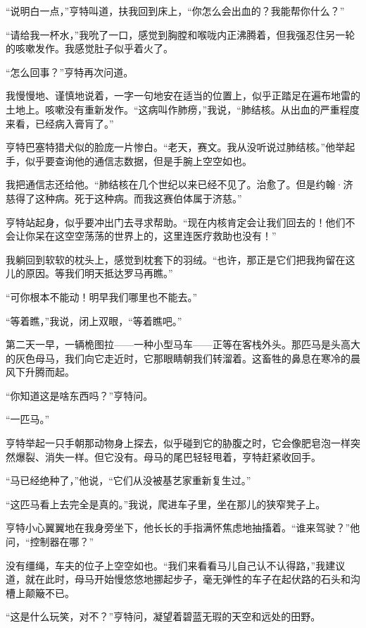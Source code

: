 \documentclass[AutoFakeBold=true]{book}
\begin{document}
``说明白一点，''亨特叫道，扶我回到床上，``你怎么会出血的？我能帮你什么？''

``请给我一杯水，''我吮了一口，感觉到胸膛和喉咙内正沸腾着，但我强忍住另一轮的咳嗽发作。我感觉肚子似乎着火了。

``怎么回事？''亨特再次问道。

我慢慢地、谨慎地说着，一字一句地安在适当的位置上，似乎正踏足在遍布地雷的土地上。咳嗽没有重新发作。``这病叫作肺痨，''我说，``肺结核。从出血的严重程度来看，已经病入膏肓了。''

亨特巴塞特猎犬似的脸庞一片惨白。``老天，赛文。我从没听说过肺结核。''他举起手，似乎要查询他的通信志数据，但是手腕上空空如也。

我把通信志还给他。``肺结核在几个世纪以来已经不见了。治愈了。但是约翰·济慈得了这种病。死于这种病。而我这赛伯体属于济慈。''

亨特站起身，似乎要冲出门去寻求帮助。``现在内核肯定会让我们回去的！他们不会让你呆在这空空荡荡的世界上的，这里连医疗救助也没有！''

我躺回到软软的枕头上，感觉到枕套下的羽绒。``也许，那正是它们把我拘留在这儿的原因。等我们明天抵达罗马再瞧。''

``可你根本不能动！明早我们哪里也不能去。''

``等着瞧，''我说，闭上双眼，``等着瞧吧。''

\vspace*{1em}

第二天一早，一辆桅图拉——一种小型马车——正等在客栈外头。那匹马是头高大的灰色母马，我们向它走近时，它那眼睛朝我们转溜着。这畜牲的鼻息在寒冷的晨风下升腾而起。

``你知道这是啥东西吗？''亨特问。

``一匹马。''

亨特举起一只手朝那动物身上探去，似乎碰到它的胁腹之时，它会像肥皂泡一样突然爆裂、消失一样。但它没有。母马的尾巴轻轻甩着，亨特赶紧收回手。

``马已经绝种了，''他说，``它们从没被基艺家重新复生过。''

``这匹马看上去完全是真的。''我说，爬进车子里，坐在那儿的狭窄凳子上。

亨特小心翼翼地在我身旁坐下，他长长的手指满怀焦虑地抽搐着。``谁来驾驶？''他问，``控制器在哪？''

没有缰绳，车夫的位子上空空如也。``我们来看看马儿自己认不认得路，''我建议道，就在此时，母马开始慢悠悠地挪起步子，毫无弹性的车子在起伏路的石头和沟槽上颠簸不已。

``这是什么玩笑，对不？''亨特问，凝望着碧蓝无瑕的天空和远处的田野。
\end{document}
